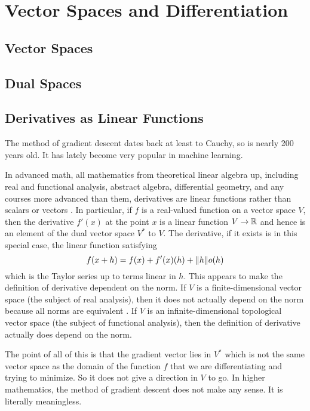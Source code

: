 
\chapter{Vector Spaces and Differentiation}
\label{app:vectors}

\section{Vector Spaces}

\section{Dual Spaces}

\section{Derivatives as Linear Functions}

\REVISED

The method of gradient descent dates back at least to Cauchy, so is
nearly 200 years old.  It has lately become very popular in machine learning.

In advanced math, all mathematics from theoretical linear algebra up,
including real and functional analysis, abstract algebra, differential
geometry, and any courses more advanced than them, derivatives are
linear functions rather than scalars or vectors
\citet[Chapters~XIII and~XXII]{lang}.  In particular, if $f$ is a real-valued
function on a vector space $V$, then the derivative $f'(x)$ at the point $x$
is a linear function $V \to \mathbb{R}$ and hence is an element of the dual vector
space $V^{\textstyle *}$ to $V$.  The derivative, if it exists is in this
special case, the linear function satisfying
$$
   f(x + h) = f(x) + f'(x)(h) + \lVert h \rVert o(h)
$$
which is the Taylor series up to terms linear in $h$.
This appears to make the definition of derivative dependent on the norm.
If $V$ is a finite-dimensional vector space (the subject of real analysis),
then it does not actually depend on the norm because all norms are equivalent
\citep[Corollary~3.14 of Chapter~II]{lang}.
If $V$ is an infinite-dimensional topological vector space
(the subject of functional analysis), then the definition of derivative
actually does depend on the norm.

The point of all of this is that the gradient vector lies in
$V^{\textstyle *}$ which is not the same vector space as the domain of
the function $f$ that we are differentiating and trying to minimize.
So it does not give a direction in $V$ to go.
In higher mathematics, the method of gradient descent does not make any
sense.  It is literally meaningless.

